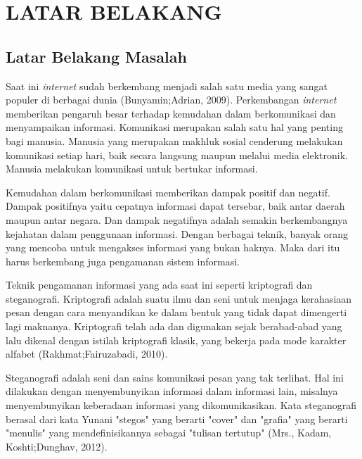 
\chapter{LATAR BELAKANG}

\section{Latar Belakang Masalah}
Saat ini \emph{internet} sudah berkembang menjadi salah satu media yang sangat populer di berbagai dunia (Bunyamin;Adrian, 2009). Perkembangan \emph{internet} memberikan pengaruh besar terhadap kemudahan dalam berkomunikasi dan menyampaikan informasi. Komunikasi merupakan salah satu hal yang penting bagi manusia. Manusia yang merupakan makhluk sosial cenderung melakukan komunikasi setiap hari, baik secara langsung maupun melalui media elektronik. Manusia melakukan komunikasi untuk bertukar informasi.

Kemudahan dalam berkomunikasi memberikan dampak positif dan negatif. Dampak positifnya yaitu cepatnya informasi dapat tersebar, baik antar daerah maupun antar negara. Dan dampak negatifnya adalah semakin berkembangnya kejahatan dalam penggunaan informasi. Dengan berbagai teknik, banyak orang yang mencoba untuk mengakses informasi yang bukan haknya. Maka dari itu harus berkembang juga pengamanan sistem informasi.

Teknik pengamanan informasi yang ada saat ini seperti kriptografi dan steganografi. Kriptografi adalah suatu ilmu dan seni untuk menjaga kerahasiaan pesan dengan cara menyandikan ke dalam bentuk yang tidak dapat dimengerti lagi maknanya. Kriptografi telah ada dan digunakan sejak berabad-abad yang lalu dikenal dengan istilah kriptografi klasik, yang bekerja pada mode karakter alfabet  (Rakhmat;Fairuzabadi, 2010).

Steganografi adalah seni dan sains komunikasi pesan yang tak terlihat. Hal ini dilakukan dengan menyembunyikan informasi dalam informasi lain, misalnya menyembunyikan keberadaan informasi yang dikomunikasikan. Kata steganografi berasal dari kata Yunani "stegos" yang berarti "cover" dan "grafia" yang berarti "menulis" yang mendefinisikannya sebagai "tulisan tertutup"  (Mrs., Kadam, Koshti;Dunghav, 2012).


